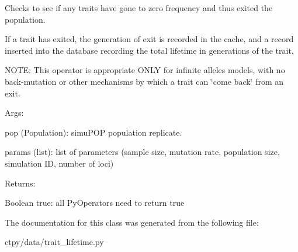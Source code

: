 Checks to see if any traits have gone to zero frequency and thus exited the population. 

If a trait has exited, the generation of exit is recorded in the cache, and a record inserted into the database recording the total lifetime in generations of the trait.

N\-O\-T\-E\-: This operator is appropriate O\-N\-L\-Y for infinite alleles models, with no back-\/mutation or other mechanisms by which a trait can \char`\"{}come back\char`\"{} from an exit.

Args\-: \begin{DoxyVerb}pop (Population):  simuPOP population replicate.

params (list):  list of parameters (sample size, mutation rate, population size, simulation ID, number of loci)
\end{DoxyVerb}


Returns\-: \begin{DoxyVerb}Boolean true:  all PyOperators need to return true\end{DoxyVerb}
 

The documentation for this class was generated from the following file\-:\begin{DoxyCompactItemize}
\item 
ctpy/data/trait\-\_\-lifetime.\-py\end{DoxyCompactItemize}
